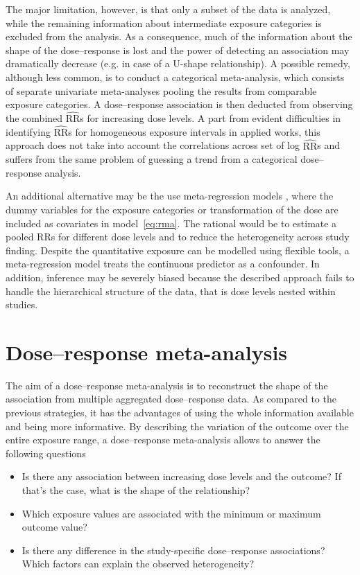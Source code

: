 \documentclass[11pt,a4paper,twoside,openany]{book}\usepackage{knitr}
\begin{document}
{The major limitation, however, is that only a subset of the data is analyzed, while the remaining information about intermediate exposure categories is excluded from the analysis. As a consequence, much of the information about the shape of the dose--response is lost and the power of detecting an association may dramatically decrease (e.g. in case of a U-shape relationship). A possible remedy, although less common, is to conduct a categorical meta-analysis, which consists of separate univariate meta-analyses pooling the results from comparable exposure categories. A dose--response association is then deducted from observing the combined $\widehat{\mathrm{RR}}$s for increasing dose levels. A part from evident difficulties in identifying $\widehat{\mathrm{RR}}$s for homogeneous exposure intervals in applied works, this approach does not take into account the correlations across set of log $\widehat{\mathrm{RR}}$s and suffers from the same problem of guessing a trend from a categorical dose--response analysis. 

An additional alternative may be the use meta-regression models \cite{berkey1995random}, where the dummy variables for the exposure categories or transformation of the dose are included as covariates in model~\ref{eq:rma}. The rational would be to estimate a pooled RRs for different dose levels and to reduce the heterogeneity across study finding. Despite the quantitative exposure can be modelled using flexible tools, a meta-regression model treats the continuous predictor as a confounder. In addition, inference may be severely biased because the described approach fails to handle the hierarchical structure of the data, that is dose levels nested within studies.



\section{Dose--response meta-analysis}

The aim of a dose--response meta-analysis is to reconstruct the shape of the association from multiple aggregated dose--response data. As compared to the previous strategies, it has the advantages of using the whole information available and being more informative. By describing the variation of the outcome over the entire exposure range, a dose--response meta-analysis allows to answer the following questions
\begin{itemize}
\item Is there any association between increasing dose levels and the outcome? If that’s the case, what is the shape of the relationship?
\item Which exposure values are associated with the minimum or maximum outcome value?
\item Is there any difference in the study-specific dose--response associations? Which factors can explain the observed heterogeneity?
\end{itemize}

}
\end{document}
